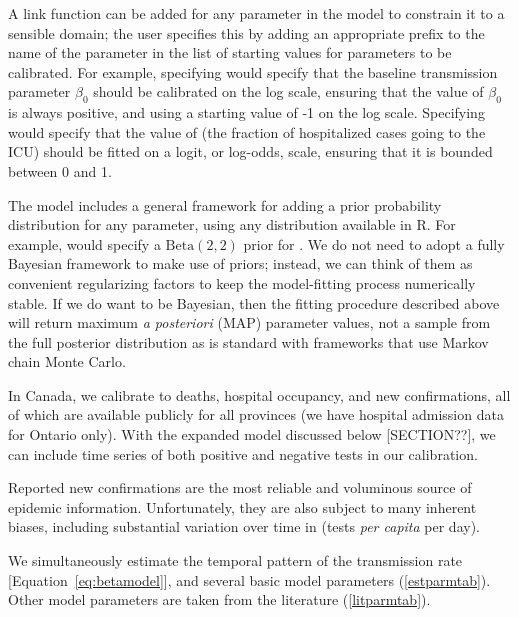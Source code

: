 \documentclass[12pt]{article}\usepackage[]{graphicx}\usepackage[]{color}
\begin{document}
A link function can be added for any parameter in the model to constrain it to
a sensible domain; the user specifies this by adding an appropriate prefix to
the name of the parameter in the list of starting values for parameters to be calibrated. For example,
specifying  would specify that the baseline transmission parameter $\beta_0$
should be calibrated on the log scale, ensuring that the value of $\beta_0$ is always positive,
and using a starting value of -1 on the log scale. Specifying  would specify
that the value of  (the fraction of hospitalized cases going to the ICU) should be fitted
on a logit, or log-odds, scale, ensuring that it is bounded between 0 and 1.

The model includes a general framework for adding a prior probability
distribution for any parameter, using any distribution available in R. For example,
 would specify a $\textrm{Beta}(2,2)$ prior for .
We do not need to adopt a fully Bayesian framework to make use of priors; instead, we
can think of them as convenient regularizing factors to keep the model-fitting process
numerically stable. If we do want to be Bayesian, then the fitting procedure described
above will return maximum \emph{a posteriori} (MAP) parameter values, not a sample from the full
posterior distribution as is standard with frameworks that use Markov chain Monte Carlo.


In Canada, we calibrate
to deaths, hospital occupancy, and new confirmations, all of which are
available publicly for all provinces (we have hospital admission data
for Ontario only).  With the expanded model discussed below [SECTION??],
we can include time series of both positive
and negative tests in our calibration. 

 

Reported new confirmations are the most reliable and voluminous source of epidemic information. 
Unfortunately, they are also subject to many inherent biases,
including substantial variation over time in 
(\ie tests \emph{per capita} per day).

We simultaneously estimate the temporal pattern of the transmission
rate [Equation~\eqref{eq:betamodel}], and several basic model
parameters (\cref{estparmtab}).  Other model parameters
are taken from the literature (\cref{litparmtab}).
\end{document}
